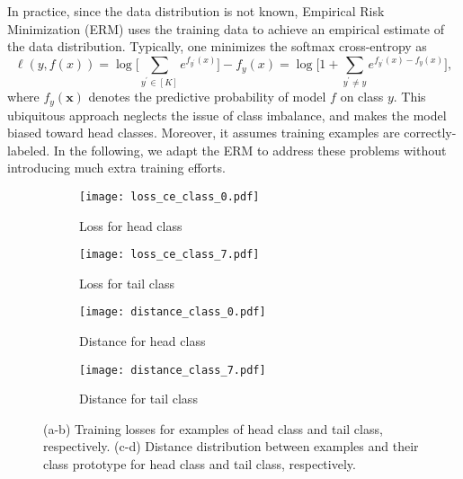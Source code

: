 \documentclass{article}
\def\x{{\boldsymbol x}}
\begin{document}
In practice, since the data distribution is not known, Empirical Risk Minimization (ERM) uses the training data to achieve an empirical estimate of the data distribution. Typically, one minimizes the softmax cross-entropy as
\begin{equation}
\ell(y, f(x))=\log \bigg[\sum_{y^{\prime} \in[K]} e^{f_{y^{\prime}}(x)}\bigg]-f_{y}(x)=\log \bigg[1+\sum_{y^{\prime} \neq y} e^{f_{y^{\prime}}(x)-f_{y}(x)}\bigg],
\end{equation}
where $f_y(\x)$ denotes the predictive probability of model $f$ on class $y$. This ubiquitous approach neglects the issue of class imbalance, and makes the model biased toward head classes. Moreover, it assumes training examples are correctly-labeled. In the following, we adapt the ERM to address these problems without introducing much extra training efforts.

\begin{figure}[t]
    \centering
    \begin{subfigure}[b]{0.236\textwidth}
        \centering
        \texttt{[image: loss\_ce\_class\_0.pdf]}
        \caption{ Loss for head class}
        \label{fig:loss_class_0}
    \end{subfigure}
    \begin{subfigure}[b]{0.231\textwidth}
        \centering
        \texttt{[image: loss\_ce\_class\_7.pdf]}
        \caption{ Loss for tail class}
        \label{fig:loss_class_7}
    \end{subfigure}
    \begin{subfigure}[b]{0.256\textwidth}
        \centering
        \texttt{[image: distance\_class\_0.pdf]} 
        \caption{Distance for head class}\label{fig:distance_class_0}
    \end{subfigure}
    \begin{subfigure}[b]{0.256\textwidth}
        \centering
        \texttt{[image: distance\_class\_7.pdf]} 
        \caption{Distance for tail class}\label{fig:distance_class_7}
    \end{subfigure}
    \caption{(a-b) Training losses for examples of head class and tail class, respectively. (c-d) Distance distribution between examples and their class prototype for head class and tail class, respectively.}
\end{figure}
\end{document}
